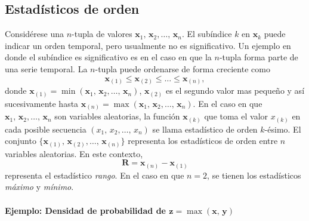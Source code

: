 \documentclass[a4paper]{report}
\newcommand{\x}{\mathbf{x}}
\newcommand{\y}{\mathbf{y}}
\newcommand{\z}{\mathbf{z}}
\begin{document}
\subsection{Estadísticos de orden}

Considérese una \(n\)-tupla de valores \(\x_1,\,\x_2,\dots,\,\x_n\). El subíndice \(k\) en \(\x_k\) puede indicar un orden temporal, pero usualmente no es significativo. Un ejemplo en donde el subíndice es significativo es en el caso en que la \(n\)-tupla forma parte de una serie temporal. La \(n\)-tupla puede ordenarse de forma creciente como
\[
 \x_{(1)}\leq\x_{(2)}\leq\dots\leq\x_{(n)},
\]
donde \(\x_{(1)}=\min(\x_1,\,\x_2,\dots,\,\x_n)\), \(\x_{(2)}\) es el segundo valor mas pequeño y así sucesivamente hasta \(\x_{(n)}=\max(\x_1,\,\x_2,\dots,\,\x_n)\). En el caso en que \(\x_1,\,\x_2,\dots,\,\x_n\) son variables aleatorias, la función \(\x_{(k)}\) que toma el valor \(x_{(k)}\) en cada posible secuencia \((x_1,\,x_2,\dots,\,x_n)\) se llama estadístico de orden \(k\)-ésimo. El conjunto \(\{\x_{(1)},\,\x_{(2)},\dots,\,\x_{(n)}\}\) representa los estadísticos de orden entre \(n\) variables aleatorias. En este contexto, 
\[
 \mathbf{R}=\x_{(n)}-\x_{(1)}
\]
representa el estadístico \emph{rango}. En el caso en que \(n=2\), se tienen los estadísticos \emph{máximo} y \emph{mínimo}.

\paragraph{\texorpdfstring{Ejemplo: Densidad de probabilidad de \(\z=\max(\x,\,\y)\)}{}}
\end{document}
